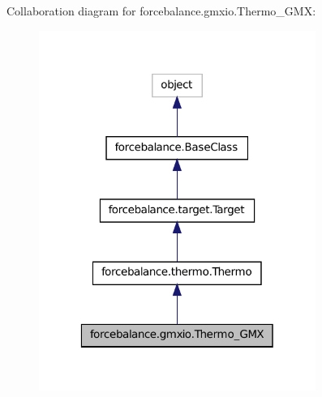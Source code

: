 Collaboration diagram for forcebalance.\-gmxio.\-Thermo\-\_\-\-G\-M\-X\-:
\nopagebreak
\begin{figure}[H]
\begin{center}
\leavevmode
\includegraphics[width=256pt]{classforcebalance_1_1gmxio_1_1Thermo__GMX__coll__graph}
\end{center}
\end{figure}
